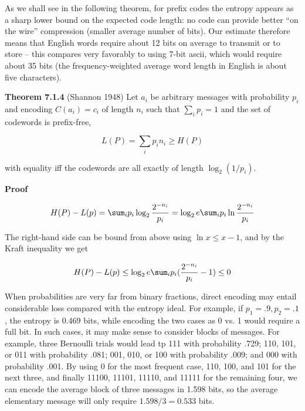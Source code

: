 \medskip\noindent As we shall see in the following theorem, for prefix codes
the entropy appears as a sharp lower bound on the expected code length: no
code can provide better ``on the wire'' compression (smaller average number of
bits). Our estimate therefore means that English words require about 12 bits
on average to transmit or to store -- this compares very favorably to using
7-bit ascii, which would require about 35 bits (the frequency-weighted average
word length in English is about five characters).

\smallskip\noindent
{\bf Theorem 7.1.4} (Shannon 1948) Let $a_i$ be arbitrary messages with
probability $p_i$ and encoding $C(a_i)=c_i$ of length $n_i$ such that 
$\sum_i p_i = 1 $ and the set of codewords is prefix-free, 

\begin{equation}
L(P)=\sum_i p_i n_i \geq H(P)
\end{equation}

\noindent
with equality iff the codewords are all exactly of length $\log_2(1/p_i)$.

\smallskip\noindent
{\bf Proof} 

\begin{equation}
H(P)-L(p)=\sum_i p_i \log_2 {2^{-n_i} \over p_i} = \log_2 e \sum _i p_i \ln {2^{-n_i} \over p_i}
\end{equation}

\noindent  
The right-hand side can be bound from above using $\ln x \leq x-1$, and by the 
Kraft inequality we get 

\begin{equation}
H(P)-L(p) \leq \log_2 e \sum _i p_i ({2^{-n_i}\over p_i} -1) \leq 0 
\end{equation}

\bigskip\noindent When probabilities are very far from binary fractions,
direct encoding may entail considerable loss compared with the entropy ideal.
For example, if $p_1=.9, p_2=.1$, the entropy is 0.469 bits, while encoding the
two cases as 0 vs. 1 would require a full bit. In such cases, it may make sense
to consider blocks of messages. For example, three Bernoulli trials would lead
tp 111 with probability .729; 110, 101, or 011 with probability .081; 001, 010,
or 100 with probability .009; and 000 with probability .001. By using 0 for
the most frequent case, 110, 100, and 101 for the next three, and finally
11100, 11101, 11110, and 11111 for the remaining four, we can encode the
average block of three messages in 1.598 bits, so the average elementary
message will only require $1.598/3=0.533$ bits. 

